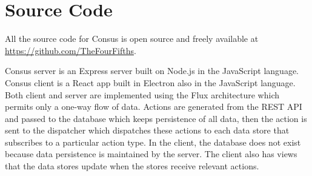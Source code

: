 \chapter{Source Code}
\label{app:source_code}

All the source code for Consus is open source and freely available at \url{https://github.com/TheFourFifths}.

Consus server is an Express server built on Node.js in the JavaScript language.
Consus client is a React app built in Electron also in the JavaScript language.
Both client and server are implemented using the Flux architecture which permits only a one-way flow of data.
Actions are generated from the REST API and passed to the database which keeps persistence of all data, then the action is sent to the dispatcher which dispatches these actions to each data store that subscribes to a particular action type.
In the client, the database does not exist because data persistence is maintained by the server.
The client also has views that the data stores update when the stores receive relevant actions.
